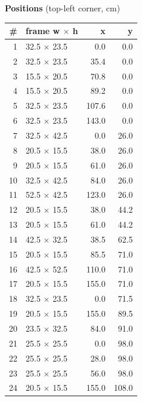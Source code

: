 \documentclass[a4paper,landscape,10pt]{article}
\begin{document}
\begin{minipage}[t]{0.25\textwidth}
\vspace{8pt}
{\bfseries Positions} (top-left corner, cm)\\[2pt]
\tiny
\begin{tabular}{@{}r l r r@{}}
\toprule
\# & frame w $\times$ h & x & y \\
\midrule
1 & 32.5 $\times$ 23.5 & 0.0 & 0.0 \\
2 & 32.5 $\times$ 23.5 & 35.4 & 0.0 \\
3 & 15.5 $\times$ 20.5 & 70.8 & 0.0 \\
4 & 15.5 $\times$ 20.5 & 89.2 & 0.0 \\
5 & 32.5 $\times$ 23.5 & 107.6 & 0.0 \\
6 & 32.5 $\times$ 23.5 & 143.0 & 0.0 \\
7 & 32.5 $\times$ 42.5 & 0.0 & 26.0 \\
8 & 20.5 $\times$ 15.5 & 38.0 & 26.0 \\
9 & 20.5 $\times$ 15.5 & 61.0 & 26.0 \\
10 & 32.5 $\times$ 42.5 & 84.0 & 26.0 \\
11 & 52.5 $\times$ 42.5 & 123.0 & 26.0 \\
12 & 20.5 $\times$ 15.5 & 38.0 & 44.2 \\
13 & 20.5 $\times$ 15.5 & 61.0 & 44.2 \\
14 & 42.5 $\times$ 32.5 & 38.5 & 62.5 \\
15 & 20.5 $\times$ 15.5 & 85.5 & 71.0 \\
16 & 42.5 $\times$ 52.5 & 110.0 & 71.0 \\
17 & 20.5 $\times$ 15.5 & 155.0 & 71.0 \\
18 & 32.5 $\times$ 23.5 & 0.0 & 71.5 \\
19 & 20.5 $\times$ 15.5 & 155.0 & 89.5 \\
20 & 23.5 $\times$ 32.5 & 84.0 & 91.0 \\
21 & 25.5 $\times$ 25.5 & 0.0 & 98.0 \\
22 & 25.5 $\times$ 25.5 & 28.0 & 98.0 \\
23 & 25.5 $\times$ 25.5 & 56.0 & 98.0 \\
24 & 20.5 $\times$ 15.5 & 155.0 & 108.0 \\
\bottomrule
\end{tabular}
\end{minipage}
\clearpage
\end{document}
